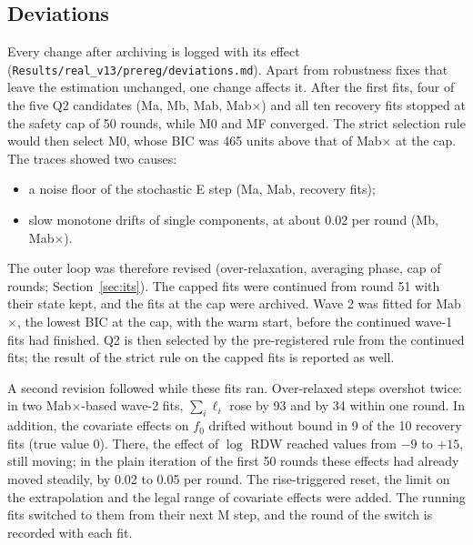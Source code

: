 \documentclass[11pt]{article}
\begin{document}
\subsection{Deviations}\label{sec:deviations}
Every change after archiving is logged with its effect (\texttt{Results/real\_v13/prereg/deviations.md}). Apart from robustness fixes that leave the estimation unchanged, one change affects it. After the first fits, four of the five Q2 candidates (Ma, Mb, Mab, Mab$\times$) and all ten recovery fits stopped at the safety cap of 50 rounds, while M0 and MF converged. The strict selection rule would then select M0, whose BIC was 465 units above that of Mab$\times$ at the cap. The traces showed two causes:
\begin{itemize}
\item a noise floor of the stochastic E step (Ma, Mab, recovery fits);
\item slow monotone drifts of single components, at about 0.02 per round (Mb, Mab$\times$).
\end{itemize}
The outer loop was therefore revised (over-relaxation, averaging phase, cap of \valOutMax{} rounds; Section~\ref{sec:its}). The capped fits were continued from round 51 with their state kept, and the fits at the cap were archived. Wave 2 was fitted for Mab$\times$, the lowest BIC at the cap, with the warm start, before the continued wave-1 fits had finished. Q2 is then selected by the pre-registered rule from the continued fits; the result of the strict rule on the capped fits is reported as well.

A second revision followed while these fits ran. Over-relaxed steps overshot twice: in two Mab$\times$-based wave-2 fits, $\sum_i\ell_i$ rose by 93 and by 34 within one round. In addition, the covariate effects on $f_0$ drifted without bound in 9 of the 10 recovery fits (true value 0). There, the effect of $\log$ RDW reached values from $-9$ to $+15$, still moving; in the plain iteration of the first 50 rounds these effects had already moved steadily, by 0.02 to 0.05 per round. The rise-triggered reset, the limit on the extrapolation and the legal range of covariate effects were added. The running fits switched to them from their next M step, and the round of the switch is recorded with each fit.



\end{document}
